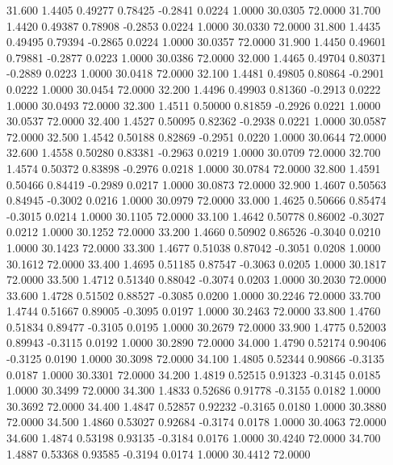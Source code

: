   31.600   1.4405   0.49277   0.78425  -0.2841   0.0224   1.0000  30.0305  72.0000
  31.700   1.4420   0.49387   0.78908  -0.2853   0.0224   1.0000  30.0330  72.0000
  31.800   1.4435   0.49495   0.79394  -0.2865   0.0224   1.0000  30.0357  72.0000
  31.900   1.4450   0.49601   0.79881  -0.2877   0.0223   1.0000  30.0386  72.0000
  32.000   1.4465   0.49704   0.80371  -0.2889   0.0223   1.0000  30.0418  72.0000
  32.100   1.4481   0.49805   0.80864  -0.2901   0.0222   1.0000  30.0454  72.0000
  32.200   1.4496   0.49903   0.81360  -0.2913   0.0222   1.0000  30.0493  72.0000
  32.300   1.4511   0.50000   0.81859  -0.2926   0.0221   1.0000  30.0537  72.0000
  32.400   1.4527   0.50095   0.82362  -0.2938   0.0221   1.0000  30.0587  72.0000
  32.500   1.4542   0.50188   0.82869  -0.2951   0.0220   1.0000  30.0644  72.0000
  32.600   1.4558   0.50280   0.83381  -0.2963   0.0219   1.0000  30.0709  72.0000
  32.700   1.4574   0.50372   0.83898  -0.2976   0.0218   1.0000  30.0784  72.0000
  32.800   1.4591   0.50466   0.84419  -0.2989   0.0217   1.0000  30.0873  72.0000
  32.900   1.4607   0.50563   0.84945  -0.3002   0.0216   1.0000  30.0979  72.0000
  33.000   1.4625   0.50666   0.85474  -0.3015   0.0214   1.0000  30.1105  72.0000
  33.100   1.4642   0.50778   0.86002  -0.3027   0.0212   1.0000  30.1252  72.0000
  33.200   1.4660   0.50902   0.86526  -0.3040   0.0210   1.0000  30.1423  72.0000
  33.300   1.4677   0.51038   0.87042  -0.3051   0.0208   1.0000  30.1612  72.0000
  33.400   1.4695   0.51185   0.87547  -0.3063   0.0205   1.0000  30.1817  72.0000
  33.500   1.4712   0.51340   0.88042  -0.3074   0.0203   1.0000  30.2030  72.0000
  33.600   1.4728   0.51502   0.88527  -0.3085   0.0200   1.0000  30.2246  72.0000
  33.700   1.4744   0.51667   0.89005  -0.3095   0.0197   1.0000  30.2463  72.0000
  33.800   1.4760   0.51834   0.89477  -0.3105   0.0195   1.0000  30.2679  72.0000
  33.900   1.4775   0.52003   0.89943  -0.3115   0.0192   1.0000  30.2890  72.0000
  34.000   1.4790   0.52174   0.90406  -0.3125   0.0190   1.0000  30.3098  72.0000
  34.100   1.4805   0.52344   0.90866  -0.3135   0.0187   1.0000  30.3301  72.0000
  34.200   1.4819   0.52515   0.91323  -0.3145   0.0185   1.0000  30.3499  72.0000
  34.300   1.4833   0.52686   0.91778  -0.3155   0.0182   1.0000  30.3692  72.0000
  34.400   1.4847   0.52857   0.92232  -0.3165   0.0180   1.0000  30.3880  72.0000
  34.500   1.4860   0.53027   0.92684  -0.3174   0.0178   1.0000  30.4063  72.0000
  34.600   1.4874   0.53198   0.93135  -0.3184   0.0176   1.0000  30.4240  72.0000
  34.700   1.4887   0.53368   0.93585  -0.3194   0.0174   1.0000  30.4412  72.0000

